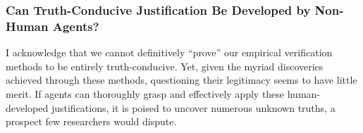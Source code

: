 




\subsubsection{Can Truth-Conducive Justification Be Developed by Non-Human Agents?}


I acknowledge that we cannot definitively ``prove'' our empirical verification methods to be entirely truth-conducive. Yet, given the myriad discoveries achieved through these methods, questioning their legitimacy seems to have little merit. If agents can thoroughly grasp and effectively apply these human-developed justifications, it is poised to uncover numerous unknown truths, a prospect few researchers would dispute.

